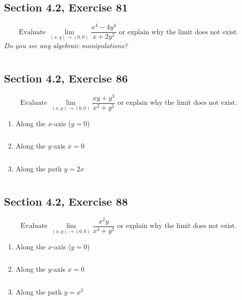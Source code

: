 \documentclass[]{mangos-musings}
\begin{document}
\subsection{Section 4.2, Exercise 81}
\[\text{Evaluate }\lim_{(x, y)\to(0, 0)} \dfrac{x^4 - 4y^4}{x + 2y^2} \text{ or explain why the limit does not exist.}\]
\textit{Do you see any algebraic manipulations?}
\begin{align*}
  \\
\end{align*}

\subsection{Section 4.2, Exercise 86}
\[\text{Evaluate }\lim_{(x, y)\to(0, 0)} \dfrac{xy + y^3}{x^2 + y^2} \text{ or explain why the limit does not exist.}\]
\begin{enumerate}[label=(\alph*)]
  \item Along the $x$-axis ($y=0$)
  \begin{align*}
  \\
  \end{align*}
  \item Along the $y$-axis $x = 0$
  \begin{align*}
  \\
  \end{align*}
  \item Along the path $y = 2x$
  \begin{align*}
  \\
  \end{align*}
\end{enumerate}

\subsection{Section 4.2, Exercise 88}
\[\text{Evaluate }\lim_{(x, y)\to(0, 0)}\dfrac{x^2y}{x^4 + y^2} \text{ or explain why the limit does not exist.}\]
\begin{enumerate}[label=(\alph*)]
  \item Along the $x$-axis ($y=0$)
  \begin{align*}
  \\
  \end{align*}
  \item Along the $y$-axis $x = 0$
  \begin{align*}
  \\ 
  \end{align*}
  \item Along the path $y = x^2$
  \begin{align*}
  \\ 
  \end{align*}
\end{enumerate}
\end{document}
